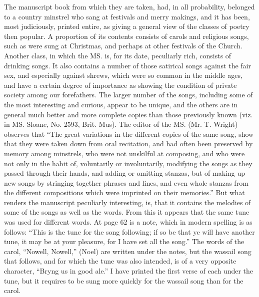 The manuscript book from which they are taken, had, in all probability, belonged
to a country minstrel who sang at festivals and merry makings, and it has been,
most judiciously, printed entire, as giving a general view of the classes of poetry
then popular. A proportion of its contents consists of carols and religious songs,
such as were sung at Christmas, and perhaps at other festivals of the Church.
Another class, in which the MS. is, for its date, peculiarly rich, consists of
drinking songs. It also contains a number of those satirical songs against the
fair sex, and especially against shrews, which were so common in the middle ages,
and have a certain degree of importance as showing the condition of private
society among our forefathers. The larger number of the songs, including some
of the most interesting and curious, appear to be unique, and the others
are in general much better and more complete copies than those previously
known (viz. in MS. Sloane, No. 2593, Brit. Mus). The editor of the MS.
(Mr. T. Wright) observes that “The great variations in the different copies of
the same song, show that they were taken down from oral recitation, and had
often been preserved by memory among minstrels, who were not unskilful at
composing, and who were not only in the habit of, voluntarily or involuntarily,
modifying the songs as they passed through their hands, and adding or omitting
stanzas, but of making up new songs by stringing together phrases and lines, and
even whole stanzas from the different compositions which were imprinted on their
memories.” But what renders the manuscript peculiarly interesting, is, that it
contains the melodies of some of the songs as well as the words. From this it
appears that the same tune was used for different words. At page 62 is a note,
which in modern spelling is as follows: “This is the tune for the song following;
if so be that ye will have another tune, it may be at your pleasure, for I have set
all the song.” The words of the carol, “Nowell, Nowell,” (Noel) are written
under the notes, but the wassail song that follows, and for which the tune was also
intended, is of a very opposite character, “Bryng us in good ale.” I have
printed the first verse of each under the tune, but it requires to be sung more
quickly for the wassail song than for the carol. 

\pagebreak